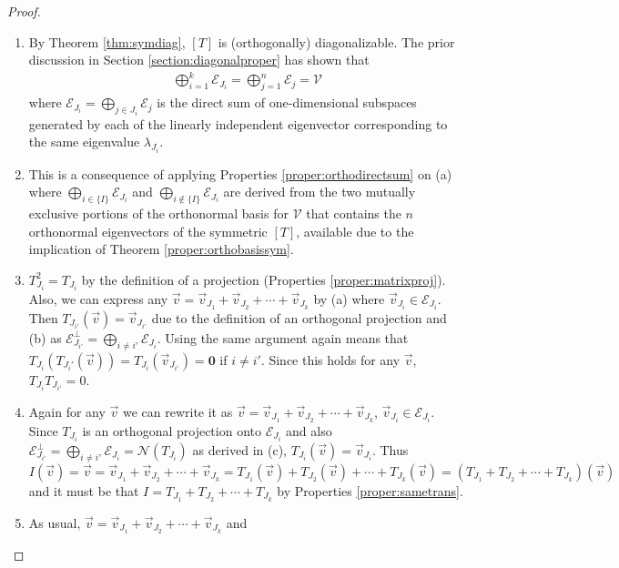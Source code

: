 \begin{proof}
\begin{enumerate}[label=(\alph*)]  
\item By Theorem \ref{thm:symdiag}, $[T]$ is (orthogonally) diagonalizable. The prior discussion in Section \ref{section:diagonalproper} has shown that
\begin{align*}
\bigoplus_{i=1}^{k} \mathcal{E}_{J_i} = \bigoplus_{j=1}^n \mathcal{E}_j = \mathcal{V} 
\end{align*}
where $\mathcal{E}_{J_i} = \bigoplus_{j \in J_i} \mathcal{E}_j$ is the direct sum of one-dimensional subspaces generated by each of the linearly independent eigenvector corresponding to the same eigenvalue $\lambda_{J_i}$.
\item This is a consequence of applying Properties \ref{proper:orthodirectsum} on (a) where $\bigoplus_{i \in \{I\}} \mathcal{E}_{J_i}$ and $\bigoplus_{i \notin \{I\}} \mathcal{E}_{J_i}$ are derived from the two mutually exclusive portions of the orthonormal basis for $\mathcal{V}$ that contains the $n$ orthonormal eigenvectors of the symmetric $[T]$, available due to the implication of Theorem \ref{proper:orthobasissym}.
\item $T_{J_i}^2 = T_{J_i}$ by the definition of a projection (Properties \ref{proper:matrixproj}). Also, we can express any $\vec{v} = \vec{v}_{J_1} + \vec{v}_{J_2} + \cdots + \vec{v}_{J_k}$ by (a) where $\vec{v}_{J_i} \in \mathcal{E}_{J_i}$. Then $T_{J_{i'}}(\vec{v}) = \vec{v}_{J_{i'}}$ due to the definition of an orthogonal projection and (b) as $\mathcal{E}_{J_{i'}}^\perp = \bigoplus_{i \neq i'} \mathcal{E}_{J_i}$. Using the same argument again means that $T_{J_i}(T_{J_i'}(\vec{v})) = T_{J_i}(\vec{v}_{J_{i'}}) = \textbf{0}$ if $i \neq i'$. Since this holds for any $\vec{v}$, $T_{J_i} T_{J_{i'}} = 0$.
\item Again for any $\vec{v}$ we can rewrite it as $\vec{v} = \vec{v}_{J_1} + \vec{v}_{J_2} + \cdots + \vec{v}_{J_k}$, $\vec{v}_{J_i} \in \mathcal{E}_{J_i}$. Since $T_{J_i}$ is an orthogonal projection onto $\mathcal{E}_{J_i}$ and also $\mathcal{E}_{J_{i'}}^\perp = \bigoplus_{i \neq i'} \mathcal{E}_{J_i} = \mathcal{N}(T_{J_i})$ as derived in (c), $T_{J_i}(\vec{v}) = \vec{v}_{J_i}$. Thus $I(\vec{v}) = \vec{v} = \vec{v}_{J_1} + \vec{v}_{J_2} + \cdots + \vec{v}_{J_k} = T_{J_1}(\vec{v}) + T_{J_2}(\vec{v}) + \cdots + T_{J_k}(\vec{v}) = (T_{J_1} + T_{J_2} + \cdots + T_{J_k})(\vec{v})$ and it must be that $I = T_{J_1} + T_{J_2} + \cdots + T_{J_k}$ by Properties \ref{proper:sametrans}.
\item As usual, $\vec{v} = \vec{v}_{J_1} + \vec{v}_{J_2} + \cdots + \vec{v}_{J_k}$ and

\end{enumerate}
\end{proof}
